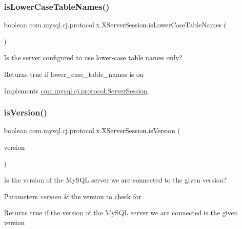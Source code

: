 \subsubsection{\texorpdfstring{is\+Lower\+Case\+Table\+Names()}{isLowerCaseTableNames()}}
{\footnotesize\ttfamily boolean com.\+mysql.\+cj.\+protocol.\+x.\+X\+Server\+Session.\+is\+Lower\+Case\+Table\+Names (\begin{DoxyParamCaption}{ }\end{DoxyParamCaption})}

Is the server configured to use lower-\/case table names only?

\begin{DoxyReturn}{Returns}
true if lower\+\_\+case\+\_\+table\+\_\+names is \textquotesingle{}on\textquotesingle{} 
\end{DoxyReturn}


Implements \mbox{\hyperlink{interfacecom_1_1mysql_1_1cj_1_1protocol_1_1_server_session_a48d31222ed61fa5971aae698a5ff9fdf}{com.\+mysql.\+cj.\+protocol.\+Server\+Session}}.

\mbox{\label{classcom_1_1mysql_1_1cj_1_1protocol_1_1x_1_1_x_server_session_aa121370ff7a1579fd5d7f4d653594f49}} 
\subsubsection{\texorpdfstring{is\+Version()}{isVersion()}}
{\footnotesize\ttfamily boolean com.\+mysql.\+cj.\+protocol.\+x.\+X\+Server\+Session.\+is\+Version (\begin{DoxyParamCaption}\item[{\mbox{\hyperlink{classcom_1_1mysql_1_1cj_1_1_server_version}{Server\+Version}}}]{version }\end{DoxyParamCaption})}

Is the version of the My\+S\+QL server we are connected to the given version?


\begin{DoxyParams}{Parameters}
{\em version} & the version to check for\\
\hline
\end{DoxyParams}
\begin{DoxyReturn}{Returns}
true if the version of the My\+S\+QL server we are connected is the given version 
\end{DoxyReturn}


